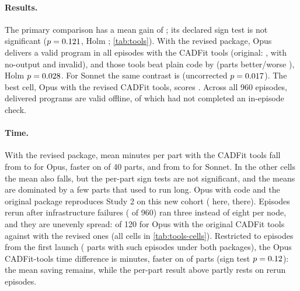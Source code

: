 \paragraph{Results.} The primary comparison has a mean gain of \tOpusSkillsVersion{} \tOpusSkillsVersionCI; its declared sign test is not significant ($p=0.121$, Holm \tOpusSkillsVersionHolm; \cref{tab:tools}). With the revised package, Opus delivers a valid program in all \tOpusSkillsVThreeValid{} episodes with the CADFit tools (original: \tOpusSkillsVTwoValid, with \tOpusSkillsVTwoNoOut{} no-output and \tOpusSkillsVTwoInvalid{} invalid), and those tools beat plain code by \tOpusSkillsVsCode{} \tOpusSkillsVsCodeCI{} (parts better/worse \tOpusSkillsVsCodeWL), Holm $p=0.028$. For Sonnet the same contrast is \tSonnetSkillsVsCode{} \tSonnetSkillsVsCodeCI{} (uncorrected $p=0.017$). The best cell, Opus with the revised CADFit tools, scores \tOpusSkillsVThree{} \tOpusSkillsVThreeCI. Across all 960 episodes, \tDeliveredValid{} delivered programs are valid offline, of which \tValidUnverified{} had not completed an in-episode check.

\paragraph{Time.} With the revised package, mean minutes per part with the CADFit tools fall from \tOpusSkillsVTwoMin{} to \tOpusSkillsVThreeMin{} for Opus, faster on \tTimeOpusSkillsFaster{} of 40 parts, and from \tSonnetSkillsVTwoMin{} to \tSonnetSkillsVThreeMin{} for Sonnet. In the other cells the mean also falls, but the per-part sign tests are not significant, and the means are dominated by a few parts that used to run long. Opus with code and the original package reproduces Study 2 on this new cohort (\tOpusCodeVTwo{} here, \cOpusCode{} there). Episodes rerun after infrastructure failures (\rTotal{} of 960) ran three instead of eight per node, and they are unevenly spread: \rOpusSkillsVTwo{} of 120 for Opus with the original CADFit tools against \rOpusSkillsVThree{} with the revised ones (all cells in \cref{tab:tools-cells}). Restricted to episodes from the first launch (\rFirstOpusSkillsParts{} parts with such episodes under both packages), the Opus CADFit-tools time difference is \rFirstOpusSkills{} \rFirstOpusSkillsCI{} minutes, faster on \rFirstOpusSkillsFaster{} of \rFirstOpusSkillsParts{} parts (sign test $p=0.12$): the mean saving remains, while the per-part result above partly rests on rerun episodes.
